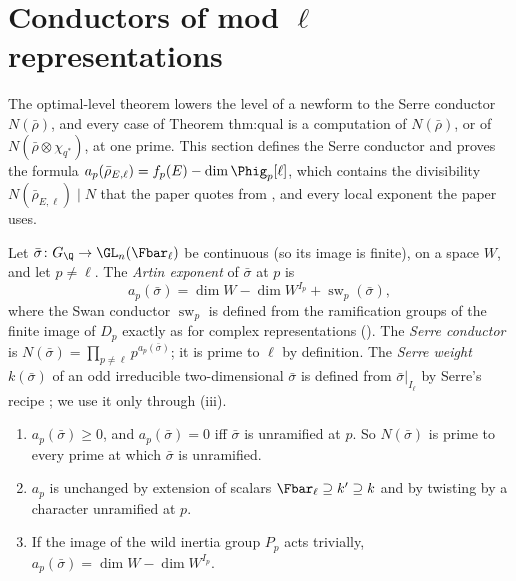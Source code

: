 \section[Conductors of mod \texorpdfstring{$\ell$}{l} representations]{Conductors of mod \texorpdfstring{$\ell$}{l} representations}\label{sec:galrep:conductors}

The optimal-level theorem lowers the level of a newform to the Serre conductor $N(\bar\rho)$, and every case of Theorem thm:qual is a
computation of $N(\bar\rho)$, or of $N(\bar\rho\otimes\chi_{q^*})$, at one prime. This section defines the Serre conductor and proves the formula
$a_p(\bar\rho_{E,\ell})=f_p(E)-\dim\Phig_p[\ell]$, which contains the divisibility $N(\bar\rho_{E,\ell})\mid N$ that the paper quotes from \cite{Carayol89}, and every
local exponent the paper uses.

\begin{definition}\label{def:galrep:serre-conductor}
Let $\bar\sigma\colon G_\Q\to\GL_n(\Fbar_\ell)$ be continuous (so its image is finite), on a space $W$, and let $p\ne\ell$. The \emph{Artin exponent} of $\bar\sigma$ at $p$ is
\[
a_p(\bar\sigma)=\dim W-\dim W^{I_p}+\operatorname{sw}_p(\bar\sigma),
\]
where the Swan conductor $\operatorname{sw}_p$ is defined from the ramification groups of the finite image of $D_p$ exactly as for complex
representations (). The \emph{Serre conductor} is $N(\bar\sigma)=\prod_{p\ne\ell}p^{a_p(\bar\sigma)}$; it is prime to $\ell$ by definition. The
\emph{Serre weight} $k(\bar\sigma)$ of an odd irreducible two-dimensional $\bar\sigma$ is defined from $\bar\sigma|_{I_\ell}$ by Serre's recipe \cite[Section 2]{Serre87};
we use it only through (iii).
\end{definition}

\begin{proposition}\label{prop:galrep:serre-conductor-basic}
\begin{enumerate}[label=(\roman*)]
\item $a_p(\bar\sigma)\ge0$, and $a_p(\bar\sigma)=0$ iff $\bar\sigma$ is unramified at $p$. So $N(\bar\sigma)$ is prime to every prime at which $\bar\sigma$ is unramified.
\item $a_p$ is unchanged by extension of scalars $\Fbar_\ell\supseteq k'\supseteq k$ and by twisting by a character unramified at $p$.
\item If the image of the wild inertia group $P_p$ acts trivially, $a_p(\bar\sigma)=\dim W-\dim W^{I_p}$.
\end{enumerate}
\end{proposition}

